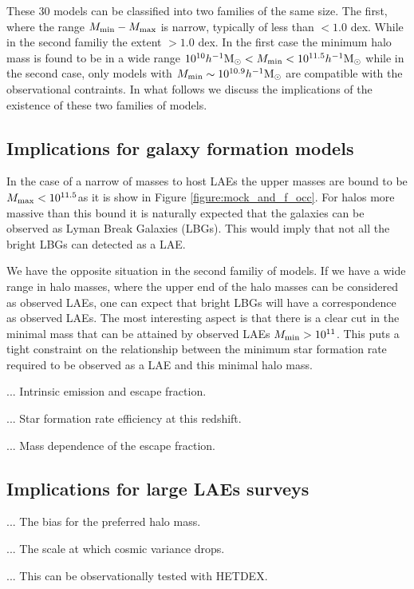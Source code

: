 \documentclass[usenatbib]{mn2e}
\newcommand{\hMsun}{{\ifmmode{h^{-1}{\rm {M_{\odot}}}}\else{$h^{-1}{\rm{M_{\odot}}}$}\fi}}
\begin{document}
These 30 models can be classified into two families of the same
size. The first, where the range $M_{\rm min}-M_{\rm max}$ is narrow,
typically of less than $<1.0$ dex. While in the second familiy the
extent $>1.0$ dex. In the first case the minimum halo mass is found to
be in a wide range $10^{10}\hMsun <M_{\rm min}< 10^{11.5}\hMsun$ while
in the second case, only models with $M_{\rm min}\sim 10^{10.9}\hMsun$
are compatible with the observational contraints. In what follows we
discuss the implications of the existence of these two families of
models.  

\subsection{Implications for galaxy formation models}

In the case of a narrow of masses to host LAEs the upper masses are
bound to be $M_{\rm max}< 10^{11.5}$\hMsun as it is show in Figure
\ref{figure:mock_and_f_occ}. For halos more massive than this bound it
is naturally expected that the galaxies can be observed as Lyman Break
Galaxies (LBGs). This would imply that not all the bright LBGs can
detected as a LAE.

We have the opposite situation in the second familiy of models. If
we have a wide range in halo masses, where the upper end of the halo
masses can be considered as observed LAEs, one can expect that bright
LBGs will have a correspondence as observed LAEs. The most interesting
aspect is that there is a clear cut in the minimal mass that can be
attained by observed LAEs $M_{\rm min}> 10^{11}$\hMsun. This puts a tight
constraint on the relationship between the minimum star formation rate
required to be observed as a LAE and this minimal halo mass.


... Intrinsic emission and escape fraction.

... Star formation rate efficiency at this redshift.

... Mass dependence of the escape fraction.


\subsection{Implications for large LAEs surveys}

... The bias for the preferred halo mass.

... The scale at which cosmic variance drops.

... This can be observationally tested with HETDEX.
\end{document}
